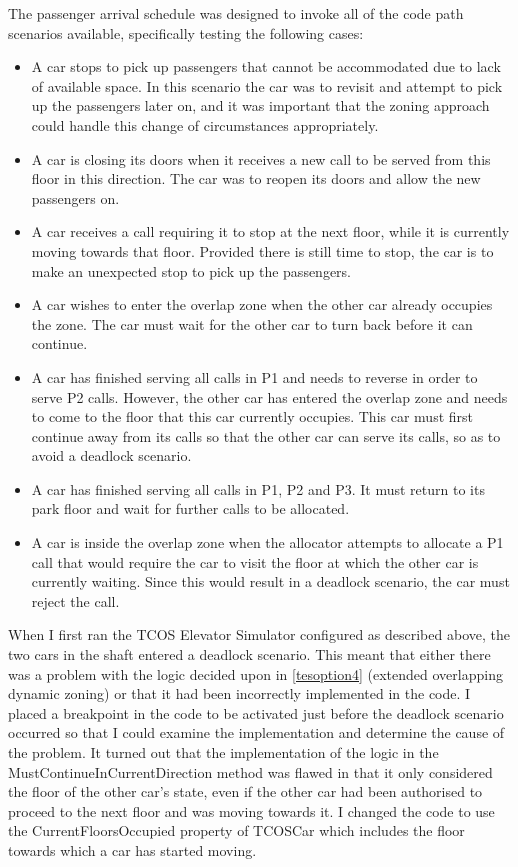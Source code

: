 \documentclass{UoYCSproject}
\begin{document}
The passenger arrival schedule was designed to invoke all of the code path scenarios available, specifically testing the following cases:
	\begin{itemize}
		\item A car stops to pick up passengers that cannot be accommodated due to lack of available space.  In this scenario the car was to revisit and attempt to pick up the passengers later on, and it was important that the zoning approach could handle this change of circumstances appropriately.
		\item A car is closing its doors when it receives a new call to be served from this floor in this direction.  The car was to reopen its doors and allow the new passengers on.
		\item A car receives a call requiring it to stop at the next floor, while it is currently moving towards that floor.  Provided there is still time to stop, the car is to make an unexpected stop to pick up the passengers.
		\item A car wishes to enter the overlap zone when the other car already occupies the zone.  The car must wait for the other car to turn back before it can continue.
		\item A car has finished serving all calls in P1 and needs to reverse in order to serve P2 calls.  However, the other car has entered the overlap zone and needs to come to the floor that this car currently occupies.  This car must first continue away from its calls so that the other car can serve its calls, so as to avoid a deadlock scenario.
		\item A car has finished serving all calls in P1, P2 and P3.  It must return to its park floor and wait for further calls to be allocated.
		\item A car is inside the overlap zone when the allocator attempts to allocate a P1 call that would require the car to visit the floor at which the other car is currently waiting.  Since this would result in a deadlock scenario, the car must reject the call.
	\end{itemize}

When I first ran the TCOS Elevator Simulator configured as described above, the two cars in the shaft entered a deadlock scenario.  This meant that either there was a problem with the logic decided upon in \autoref{tesoption4} (extended overlapping dynamic zoning) or that it had been incorrectly implemented in the code.  I placed a breakpoint in the code to be activated just before the deadlock scenario occurred so that I could examine the implementation and determine the cause of the problem.  It turned out that the implementation of the logic in the MustContinueInCurrentDirection method was flawed in that it only considered the floor of the other car's state, even if the other car had been authorised to proceed to the next floor and was moving towards it.  I changed the code to use the CurrentFloorsOccupied property of TCOSCar which includes the floor towards which a car has started moving.
\end{document}
